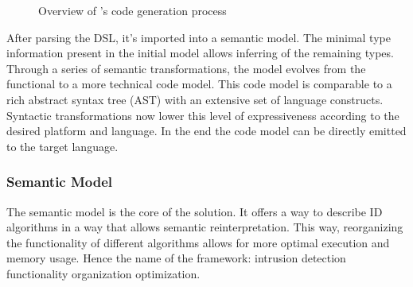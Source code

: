 \documentclass[conference]{IEEEtran}
\begin{document}
\begin{figure}[ht]
  \centering
\caption{Overview of \NAME's code generation process}
\label{fig:code-generation}
\end{figure}

After parsing the DSL, it's imported into a semantic model. The minimal type
information present in the initial model allows inferring of the remaining
types. Through a series of semantic transformations, the model evolves from the
functional to a more technical code model. This code model is comparable to a
rich abstract syntax tree (AST) with an extensive set of language constructs.
Syntactic transformations now lower this level of expressiveness according to
the desired platform and language. In the end the code model can be directly
emitted to the target language.

\subsubsection{Semantic Model}

The semantic model is the core of the solution. It offers a way to describe ID
algorithms in a way that allows semantic reinterpretation. This way,
reorganizing the functionality of different algorithms allows for more optimal
execution and memory usage. Hence the name \NAME of the framework: intrusion
detection functionality organization optimization.
\end{document}
